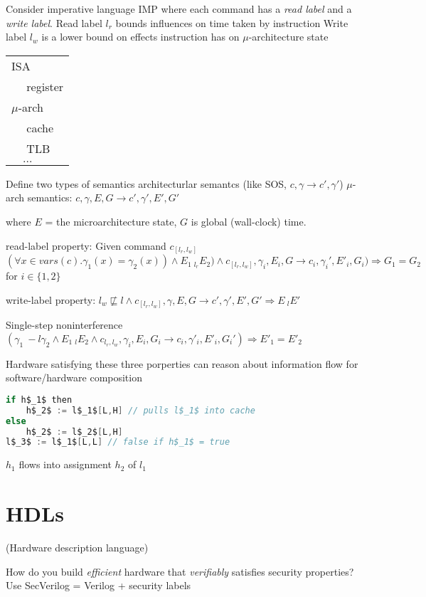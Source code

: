 \documentclass{article}
\begin{document}
Consider imperative language IMP where each command has a \emph{read label} and a \emph{write label}.
Read label $l_r$ bounds influences on time taken by instruction
Write label $l_w$ is a lower bound on effects instruction has on $\mu$-architecture state
\begin{tabular}{|l|}
\hline
ISA \\
$\quad$ register \\
\hline
$\mu$-arch \\
$\quad$ cache \\
$\quad$ TLB \\
$\quad \ldots$ \\
\hline
\end{tabular}

Define two types of semantics
architecturlar semantcs (like SOS, $c,\gamma \longrightarrow c',\gamma'$)
$\mu$-arch semantics: $c,\gamma,E,G \longrightarrow c',\gamma',E',G'$

where $E$ =  the microarchitecture state, $G$ is global (wall-clock) time.
 
read-label property: Given command $c_[l_r,l_w]$
$(\forall x \in vars(c) . \gamma_1(x) = \gamma_2(x)) \land E_1 ~_{l_r} E_2) \land c_[l_r,l_w],\gamma_i,E_i,G \longrightarrow c_i,\gamma_i',E'_i,G_i)  \Rightarrow G_1 = G_2$ for $i \in 
\{1,2\}$

write-label property: $l_w \not\sqsubseteq l \land c_{[l_r,l_w]}, \gamma,E,G \longrightarrow c', \gamma',E',G' \Rightarrow E ~_l E' $

Single-step noninterference
$(\gamma_1 ~-l \gamma_2 \land E_1 ~_l E_2 \land c_{l_r,l_w},\gamma_i,E_i,G_i \longrightarrow c_i,\gamma'_i,E'_i,G_i') \Rightarrow E'_1 = E'_2$

Hardware satisfying these three porperties can reason about information flow for software/hardware composition

\begin{lstlisting}[mathescape,frame=single,basicstyle=\ttfamily,language=java]
if h$_1$ then
    h$_2$ := l$_1$[L,H] // pulls l$_1$ into cache
else 
    h$_2$ := l$_2$[L,H]
l$_3$ := l$_1$[L,L] // false if h$_1$ = true
\end{lstlisting}
$h_1$ flows into assignment $h_2$ of $l_1$

\section{HDLs}
(Hardware description language)

How do you build \emph{efficient} hardware that \emph{verifiably} satisfies security properties?
Use SecVerilog = Verilog + security labels
\end{document}
